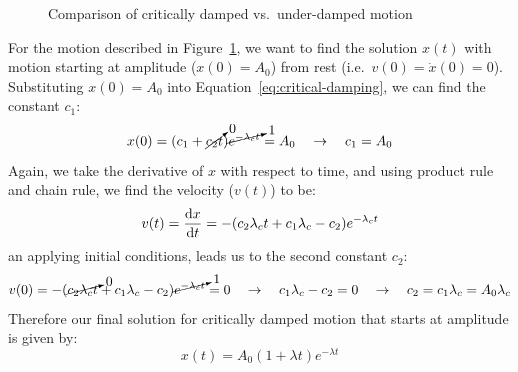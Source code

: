 \begin{figure}[ht]
  \centering
  \caption{Comparison of critically damped vs.\ under-damped motion}
  \label{fig:critical-damping-appendix}
\end{figure}
For the motion described in Figure~\ref{fig:critical-damping-appendix}, we want
to find the solution $x(t)$ with motion starting at amplitude ($x(0)=A_0$) from
rest (i.e.\ $v(0)=\dot x(0)=0$). Substituting $x(0)=A_0$ into
Equation~\ref{eq:critical-damping}, we can find the constant $c_1$:
\begin{equation}
  x(0)=(c_1+\cancelto{0}{c_2t})\cancelto{1}{e^{-\lambda_ct}}=A_0
  \quad\to\quad
  c_1=A_0
\end{equation}
Again, we take the derivative of $x$ with respect to time, and using product
rule and chain rule, we find the velocity ($v(t)$) to be:
\begin{equation}
  v(t)=\diff xt=-(c_2\lambda_ct +c_1\lambda_c-c_2)e^{-\lambda_ct}
\end{equation}
an applying initial conditions, leads us to the second constant $c_2$:
\begin{equation*}
  v(0)
  =-(\cancelto{0}{c_2\lambda_ct} +c_1\lambda_c-c_2)\cancelto{1}{e^{-\lambda_ct}}
  =0
  \quad\to\quad
  c_1\lambda_c-c_2=0
  \quad\to\quad
  c_2=c_1\lambda_c=A_0\lambda_c
\end{equation*}
Therefore our final solution for critically damped motion that starts at
amplitude is given by:
\begin{equation}
  x(t)=A_0(1+\lambda t)e^{-\lambda t}
\end{equation}

